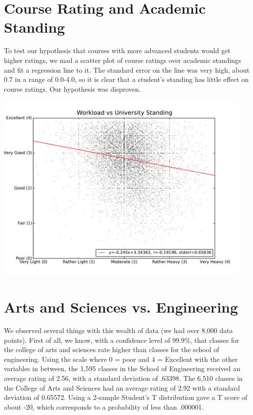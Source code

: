 \documentclass[12pt]{article}
\begin{document}
\section{Course Rating and Academic Standing}
To test our hypothesis that courses with more advanced students would get higher ratings, we mad a scatter plot of course ratings over academic standings and fit a regression line to it. The standard error on the line was very high, about 0.7 in a range of 0.0-4.0, so it is clear that a student's standing has little effect on course ratings. Our hypothesis was disproven.

\begin{center}
    \includegraphics[width=5in]{figures/rating_vs_standing.pdf}
\end{center}

\section{Arts and Sciences vs. Engineering}
We observed several things with this wealth of data (we had over 8,000 data points). First of all, we know, with a confidence level of 99.9\%, that classes for the college of arts and sciences rate higher than classes for the school of engineering. Using the scale where 0 = poor and 4 = Excellent with the other variables in between, the 1,595 classes in the School of Engineering received an average rating of 2.56, with a standard deviation of .63398. The 6,510 classes in the College of Arts and Sciences had an average rating of 2.92 with a standard deviation of 0.65572. Using a 2-sample Student's T distribution gave a T score of about -20, which corresponds to a probability of less than .000001.
\end{document}
